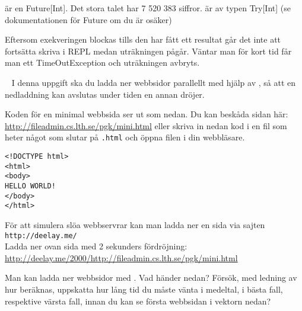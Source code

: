 \SubtaskSolved  {} är en Future[Int]. Det stora talet har 7 520 383 siffror.  är av typen Try[Int] (se dokumentationen för Future om du är osäker)

\SubtaskSolved  Eftersom exekveringen blockas tills den har fått ett resultat går det inte att fortsätta skriva i REPL medan uträkningen pågår. Väntar man för kort tid får man ett TimeOutException och uträkningen avbryts.


\QUESTEND







\QUESTBEGIN

\Task  \what~
I denna uppgift ska du ladda ner webbsidor parallellt med hjälp av , så att en nedladdning kan avslutas under tiden en annan dröjer.

\Subtask Koden för en minimal webbsida ser ut som nedan. Du kan beskåda sidan här: \url{http://fileadmin.cs.lth.se/pgk/mini.html} eller skriva in nedan kod i en fil som heter något som slutar på \texttt{.html} och öppna filen i din webbläsare.

\begin{verbatim}
<!DOCTYPE html>
<html>
<body>
HELLO WORLD!
</body>
</html>
\end{verbatim}

\Subtask För att simulera slöa webbservrar kan man ladda ner en sida via sajten \\\texttt{http://deelay.me/} \\ Ladda ner ovan sida med 2 sekunders fördröjning:\\
\url{http://deelay.me/2000/http://fileadmin.cs.lth.se/pgk/mini.html}

\Subtask Man kan ladda ner webbsidor med . Vad händer nedan? Försök, med ledning av hur  beräknas, uppskatta hur lång tid du måste vänta i medeltal, i bästa fall, respektive värsta fall, innan du kan se första webbsidan i vektorn  nedan?


